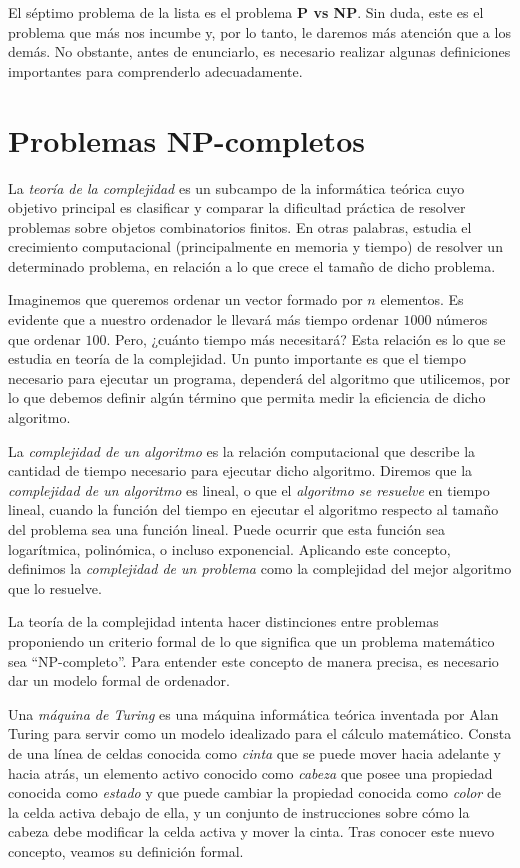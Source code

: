     El séptimo problema de la lista es el problema \textbf{P vs NP}. Sin duda, este es el problema que más nos incumbe y, por lo tanto, le daremos más atención que a los demás. No obstante, antes de enunciarlo, es necesario realizar algunas definiciones importantes para comprenderlo adecuadamente.
    
    \section{Problemas NP-completos}

    La \textit{teoría de la complejidad} \cite{theoryComp} es un subcampo de la informática teórica cuyo objetivo principal es clasificar y comparar la dificultad práctica de resolver problemas sobre objetos combinatorios finitos. En otras palabras, estudia el crecimiento computacional (principalmente en memoria y tiempo) de resolver un determinado problema, en relación a lo que crece el tamaño de dicho problema.

    Imaginemos que queremos ordenar un vector formado por $n$ elementos. Es evidente que a nuestro ordenador le llevará más tiempo ordenar $1000$ números que ordenar $100$. Pero, ¿cuánto tiempo más necesitará? Esta relación es lo que se estudia en teoría de la complejidad. Un punto importante es que el tiempo necesario para ejecutar un programa, dependerá del algoritmo que utilicemos, por lo que debemos definir algún término que permita medir la eficiencia de dicho algoritmo. 

   La \textit{complejidad de un algoritmo} es la relación computacional que describe la cantidad de tiempo necesario para ejecutar dicho algoritmo. Diremos que la \textit{complejidad de un algoritmo} es lineal, o que el \textit{algoritmo se resuelve} en tiempo lineal, cuando la función del tiempo en ejecutar el algoritmo respecto al tamaño del problema sea una función lineal. Puede ocurrir que esta función sea logarítmica, polinómica, o incluso exponencial. Aplicando este concepto, definimos la \textit{complejidad de un problema} como la complejidad del mejor algoritmo que lo resuelve.

    La teoría de la complejidad intenta hacer distinciones entre problemas proponiendo un criterio formal de lo que significa que un problema matemático sea ``NP-completo''. Para entender este concepto de manera precisa, es necesario dar un modelo formal de ordenador.

    Una \textit{máquina de Turing} \cite{MT} es una máquina informática teórica inventada por Alan Turing para servir como un modelo idealizado para el cálculo matemático. Consta de una línea de celdas conocida como \textit{cinta} que se puede mover hacia adelante y hacia atrás, un elemento activo conocido como \textit{cabeza} que posee una propiedad conocida como \textit{estado} y que puede cambiar la propiedad conocida como \textit{color} de la celda activa debajo de ella, y un conjunto de instrucciones sobre cómo la cabeza debe modificar la celda activa y mover la cinta. Tras conocer este nuevo concepto, veamos su definición formal.

